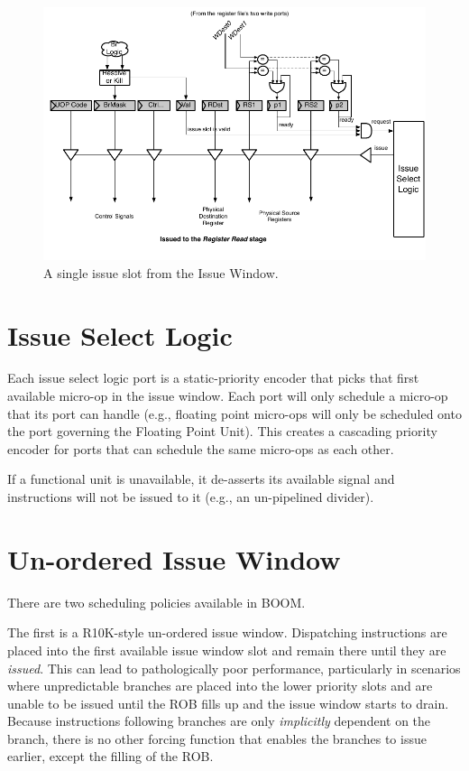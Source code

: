 \begin{figure}[ht]
	\centering
	\centerline{\includegraphics[scale =1.0] {figures/issue_slot}}
	\caption{ \small A single issue slot from the Issue Window.}
	\label{fig:riscv-boom_issue_slot}
\end{figure}

\section{Issue Select Logic}

Each issue select logic port is a static-priority encoder that picks that first available micro-op in the issue window.  Each port will only schedule a micro-op that its port can handle (e.g., floating point micro-ops will only be scheduled onto the port governing the Floating Point Unit). This creates a cascading priority encoder for ports that can schedule the same micro-ops as each other. 

If a functional unit is unavailable, it de-asserts its available signal and instructions will not be issued to it (e.g., an un-pipelined divider). 

\section{Un-ordered Issue Window}

There are two scheduling policies available in BOOM.

The first is a R10K-style un-ordered issue window.\cite{mipsr10k}  Dispatching instructions are placed into the first available issue window slot and remain there until they are {\em issued}.  This can lead to pathologically poor performance, particularly in scenarios where unpredictable branches are placed into the lower priority slots and are unable to be issued until the ROB fills up and the issue window starts to drain.  Because instructions following branches are only {\em implicitly} dependent on the branch, there is no other forcing function that enables the branches to issue earlier, except the filling of the ROB. 

